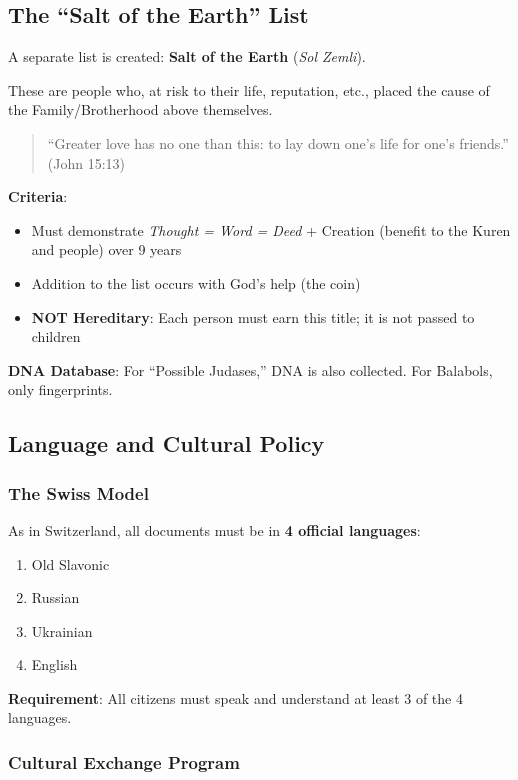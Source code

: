 \documentclass[11pt,a4paper]{article}
\theoremstyle{definition}
\theoremstyle{remark}
\begin{document}
\subsection{The ``Salt of the Earth'' List}

A separate list is created: \textbf{Salt of the Earth} (\textit{Sol Zemli}).

These are people who, at risk to their life, reputation, etc., placed the cause of the Family/Brotherhood above themselves.

\begin{quote}
``Greater love has no one than this: to lay down one's life for one's friends.'' (John 15:13)
\end{quote}

\textbf{Criteria}:
\begin{itemize}
\item Must demonstrate \textit{Thought = Word = Deed} + Creation (benefit to the Kuren and people) over 9 years
\item Addition to the list occurs with God's help (the coin)
\item \textbf{NOT Hereditary}: Each person must earn this title; it is not passed to children
\end{itemize}

\textbf{DNA Database}: For ``Possible Judases,'' DNA is also collected. For Balabols, only fingerprints.

\subsection{Language and Cultural Policy}

\subsubsection{The Swiss Model}

As in Switzerland, all documents must be in \textbf{4 official languages}:
\begin{enumerate}
\item Old Slavonic
\item Russian
\item Ukrainian
\item English
\end{enumerate}

\textbf{Requirement}: All citizens must speak and understand at least 3 of the 4 languages.

\subsubsection{Cultural Exchange Program}
\end{document}
